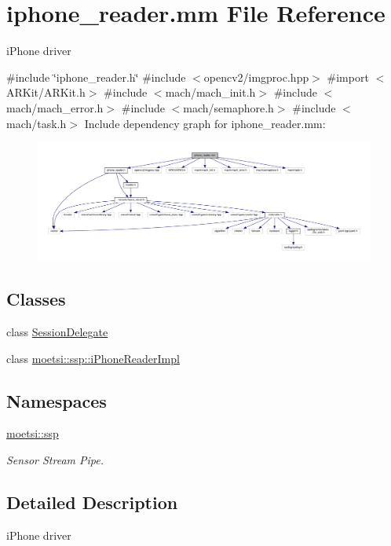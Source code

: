\hypertarget{iphone__reader_8mm}{}\section{iphone\+\_\+reader.\+mm File Reference}
\label{iphone__reader_8mm}


i\+Phone driver  


{\ttfamily \#include \char`\"{}iphone\+\_\+reader.\+h\char`\"{}}\newline
{\ttfamily \#include $<$opencv2/imgproc.\+hpp$>$}\newline
{\ttfamily \#import $<$A\+R\+Kit/\+A\+R\+Kit.\+h$>$}\newline
{\ttfamily \#include $<$mach/mach\+\_\+init.\+h$>$}\newline
{\ttfamily \#include $<$mach/mach\+\_\+error.\+h$>$}\newline
{\ttfamily \#include $<$mach/semaphore.\+h$>$}\newline
{\ttfamily \#include $<$mach/task.\+h$>$}\newline
Include dependency graph for iphone\+\_\+reader.\+mm\+:
\nopagebreak
\begin{figure}[H]
\begin{center}
\leavevmode
\includegraphics[width=350pt]{iphone__reader_8mm__incl}
\end{center}
\end{figure}
\subsection*{Classes}
\begin{DoxyCompactItemize}
\item 
class \hyperlink{interfaceSessionDelegate}{Session\+Delegate}
\item 
class \hyperlink{classmoetsi_1_1ssp_1_1iPhoneReaderImpl}{moetsi\+::ssp\+::i\+Phone\+Reader\+Impl}
\end{DoxyCompactItemize}
\subsection*{Namespaces}
\begin{DoxyCompactItemize}
\item 
 \hyperlink{namespacemoetsi_1_1ssp}{moetsi\+::ssp}
\begin{DoxyCompactList}\small\item\em Sensor Stream Pipe. \end{DoxyCompactList}\end{DoxyCompactItemize}


\subsection{Detailed Description}
i\+Phone driver 

